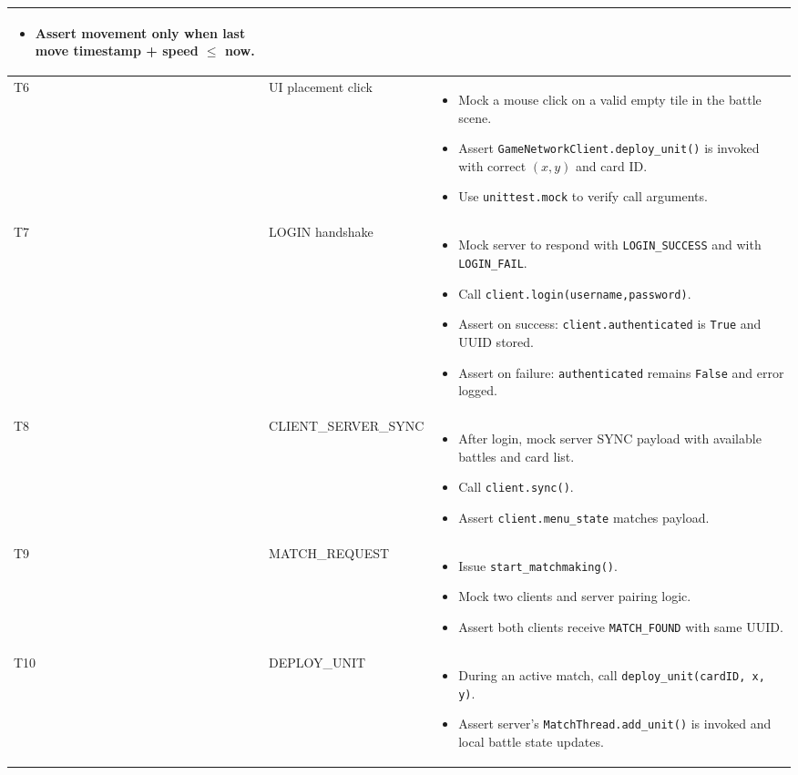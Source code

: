 \documentclass[11pt,a4paper]{article}
\begin{document}
\begin{longtable}{p{1cm} p{4.5cm} p{4.5cm}}
\begin{itemize}[nosep]
  \item Assert movement only when last move timestamp + speed \(\le\) now.  
\end{itemize} \\[1ex]
\hline
T6 & UI placement click &  
\begin{itemize}[nosep]
  \item Mock a mouse click on a valid empty tile in the battle scene.  
  \item Assert \texttt{GameNetworkClient.deploy\_unit()} is invoked with correct \((x,y)\) and card ID.  
  \item Use \texttt{unittest.mock} to verify call arguments.  
\end{itemize} \\[1ex]
\hline
T7 & LOGIN handshake &  
\begin{itemize}[nosep]
  \item Mock server to respond with \texttt{LOGIN\_SUCCESS} and with \texttt{LOGIN\_FAIL}.  
  \item Call \texttt{client.login(username,password)}.  
  \item Assert on success: \texttt{client.authenticated} is \texttt{True} and UUID stored.  
  \item Assert on failure: \texttt{authenticated} remains \texttt{False} and error logged.  
\end{itemize} \\[1ex]
\hline
T8 & CLIENT\_SERVER\_SYNC &  
\begin{itemize}[nosep]
  \item After login, mock server SYNC payload with available battles and card list.  
  \item Call \texttt{client.sync()}.  
  \item Assert \texttt{client.menu\_state} matches payload.  
\end{itemize} \\[1ex]
\hline
T9 & MATCH\_REQUEST &  
\begin{itemize}[nosep]
  \item Issue \texttt{start\_matchmaking()}.  
  \item Mock two clients and server pairing logic.  
  \item Assert both clients receive \texttt{MATCH\_FOUND} with same UUID.  
\end{itemize} \\[1ex]
\hline
T10 & DEPLOY\_UNIT &  
\begin{itemize}[nosep]
  \item During an active match, call \texttt{deploy\_unit(cardID, x, y)}.  
  \item Assert server’s \texttt{MatchThread.add\_unit()} is invoked and local battle state updates.  
\end{itemize} \\ \bottomrule
\end{longtable}
\end{document}
